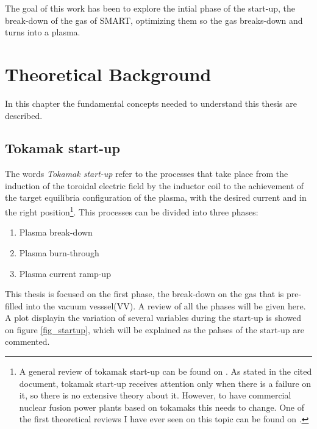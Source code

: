 \documentclass[a4paper,12pt,oneside]{book}
\begin{document}
The goal of this work has been to explore the intial phase of the  start-up, the break-down of the gas of SMART, optimizing them so the gas breaks-down and turns into a plasma.





\chapter{Theoretical Background}

In this chapter the fundamental concepts needed to understand this thesis are described.


\section{Tokamak start-up}

The words \textit{Tokamak start-up} refer to the processes that take place from the induction of the toroidal electric field by the inductor coil to the achievement of the target equilibria configuration of the plasma, with the desired current and in the right position\footnote{A general review of tokamak start-up can be found on \cite{MuellerStartup}. As stated in the cited document, tokamak start-up receives attention only when there is a failure on it, so there is no extensive theory about it. However, to have commercial nuclear fusion power plants based on tokamaks this needs to change. One of the first theoretical reviews I have ever seen on this topic can be found on \cite{ITER_2019}.}. This processes can be divided into three phases:
%
%
\begin{enumerate}
	\item Plasma break-down
	\item Plasma burn-through
	\item Plasma current ramp-up
\end{enumerate}

This thesis is focused on the first phase, the break-down on the gas that is pre-filled into the vacuum vesssel(VV). A review of all the phases will be given here. A plot displayin the variation of several variables during the start-up is showed on figure \ref{fig_startup}, which will be explained as the pahses of the start-up are commented.
\end{document}

